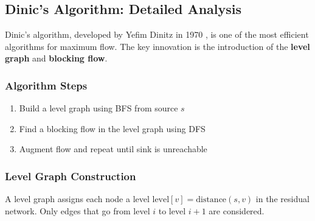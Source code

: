 \documentclass[12pt,a4paper]{article}
\begin{document}
\begin{table}[H]
\centering
\caption{Comprehensive Comparison of Maximum Flow Algorithms}
\label{tab:algorithm_comparison}
\end{table}

\subsection{Dinic's Algorithm: Detailed Analysis}
Dinic's algorithm, developed by Yefim Dinitz in 1970 \cite{dinic1970}, is one of the most efficient algorithms for maximum flow. The key innovation is the introduction of the \textbf{level graph} and \textbf{blocking flow}.

\subsubsection{Algorithm Steps}
\begin{enumerate}
    \item Build a level graph using BFS from source \(s\)
    \item Find a blocking flow in the level graph using DFS
    \item Augment flow and repeat until sink is unreachable
\end{enumerate}

\subsubsection{Level Graph Construction}
A level graph assigns each node a level \( \text{level}[v] = \text{distance}(s, v) \) in the residual network. Only edges that go from level \(i\) to level \(i+1\) are considered.
\end{document}

